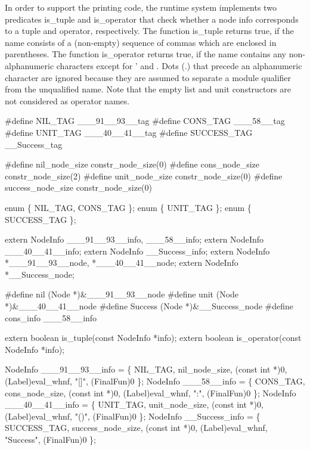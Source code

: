 In order to support the printing code, the runtime system implements
two predicates {\Tt{}is{\_}tuple\nwendquote} and {\Tt{}is{\_}operator\nwendquote} that check whether a
node info corresponds to a tuple and operator, respectively. The
function {\Tt{}is{\_}tuple\nwendquote} returns {\Tt{}true\nwendquote}, if the name consists of a
(non-empty) sequence of commas which are enclosed in parentheses. The
function {\Tt{}is{\_}operator\nwendquote} returns {\Tt{}true\nwendquote}, if the name contains any
non-alphanumeric characters except for {\Tt{}'\nwendquote} and {\Tt{}{\_}\nwendquote}. Dots ({\Tt{}.\nwendquote}) %
that precede an alphanumeric character are ignored because they are
assumed to separate a module qualifier from the unqualified name. Note
that the empty list and unit constructors are not considered as
operator names.

\nwenddocs{}\plusendmoddef\nwstartdeflinemarkup{}\nwenddeflinemarkup
#define NIL_TAG  ___91__93__tag
#define CONS_TAG ___58__tag
#define UNIT_TAG ___40__41__tag
#define SUCCESS_TAG __Success_tag

#define nil_node_size     constr_node_size(0)
#define cons_node_size    constr_node_size(2)
#define unit_node_size    constr_node_size(0)
#define success_node_size constr_node_size(0)

enum \{ NIL_TAG, CONS_TAG \};
enum \{ UNIT_TAG \};
enum \{ SUCCESS_TAG \};

extern NodeInfo ___91__93__info, ___58__info;
extern NodeInfo ___40__41__info;
extern NodeInfo __Success_info;
extern NodeInfo *___91__93__node, *___40__41__node;
extern NodeInfo *__Success_node;

#define nil  (Node *)&___91__93__node
#define unit (Node *)&___40__41__node
#define Success (Node *)&__Success_node
#define cons_info ___58__info

extern boolean is_tuple(const NodeInfo *info);
extern boolean is_operator(const NodeInfo *info);

\nwendcode{}\nwdocspar
\nwenddocs{}\plusendmoddef\nwstartdeflinemarkup{}\nwenddeflinemarkup
NodeInfo ___91__93__info = \{
    NIL_TAG, nil_node_size, (const int *)0, (Label)eval_whnf, "[]", (FinalFun)0
\};
NodeInfo ___58__info = \{
    CONS_TAG, cons_node_size, (const int *)0, (Label)eval_whnf, ":", (FinalFun)0
\};
NodeInfo ___40__41__info = \{
    UNIT_TAG, unit_node_size, (const int *)0, (Label)eval_whnf, "()", (FinalFun)0
\};
NodeInfo __Success_info = \{
    SUCCESS_TAG, success_node_size, (const int *)0, (Label)eval_whnf, "Success",
    (FinalFun)0
\};

